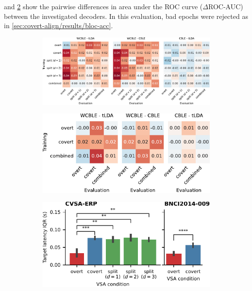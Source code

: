  and \cref{fig:covert-align/aloise2012-cross-eval} show
the pairwise differences in area under the ROC curve ($\Delta$ROC-AUC)
between the investigated decoders.
In this evaluation, bad epochs were rejected as in \cref{sec:covert-align/results/bloc-acc}.
\begin{figure}
  \bigskip
	\begin{subfigure}{\linewidth}
		\caption{}
		\label{fig:covert-align/covert-cross-eval}
		\includegraphics[width=\linewidth]{figures/covert_align/figure5a.pdf}
	\end{subfigure}

	\bigskip
	\bigskip

	\begin{subfigure}[c]{.48\linewidth}
		\caption{}
		\label{fig:covert-align/aloise2012-cross-eval}
		\includegraphics[width=\linewidth]{figures/covert_align/figure5b.pdf}
	\end{subfigure}\hfill%
	\begin{subfigure}[c]{.48\linewidth}
		\caption{}
		\label{fig:jitter}
		\includegraphics[width=\linewidth]{figures/covert_align/figure5c.pdf}
	\end{subfigure}


\end{figure}
